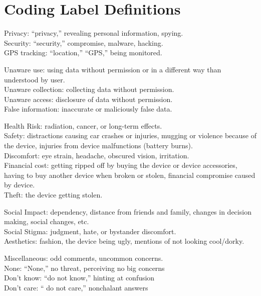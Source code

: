 \documentclass{acm_proc_article-sp}
\begin{document}
\section{Coding Label Definitions}
\label{sec:coding}

Privacy: ``privacy,'' revealing personal information, spying. \\
Security:  ``security,'' compromise, malware, hacking. \\
GPS tracking: ``location,'' ``GPS,'' being monitored. 

Unaware use: using data without permission or in a different way than understood by user. \\
Unaware collection: collecting data without permission. \\
Unaware access: disclosure of data without permission. \\
False information: inaccurate or maliciously false data.

Health Risk: radiation, cancer, or long-term effects.\\
Safety: distractions causing car crashes or injuries, mugging or violence because of the device, injuries from device malfunctions (battery burns).\\
Discomfort: eye strain, headache, obscured vision, irritation. \\
Financial cost: getting ripped off by buying the device or device accessories, having to buy another device when broken or stolen, financial compromise caused by device. \\
Theft: the device getting stolen. 

Social Impact: dependency, distance from friends and family, changes in decision making, social changes, etc. \\
Social Stigma: judgment, hate, or bystander discomfort.\\ 
Aesthetics: fashion, the device being ugly, mentions of not looking cool/dorky. 

Miscellaneous: odd comments, uncommon concerns. \\
None: ``None,'' no threat, perceiving no big concerns \\
Don't know: ``do not know,'' hinting at confusion \\
Don't care: `` do not care,'' nonchalant answers 



\balancecolumns

\end{document}
